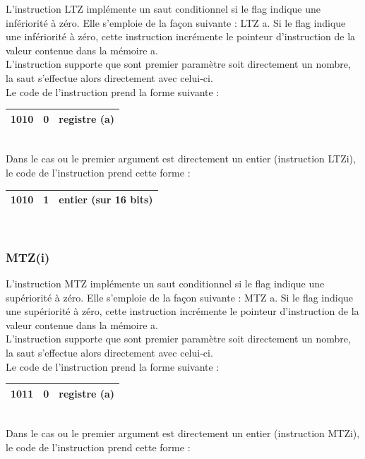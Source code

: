\documentclass[a4paper, 12pt, twoside]{report}
\begin{document}
L'instruction LTZ implémente un saut conditionnel si le flag indique une infériorité à zéro. 
Elle s'emploie de la façon suivante : LTZ a. Si le flag indique une infériorité à zéro, 
cette instruction incrémente le pointeur d'instruction de la valeur contenue dans 
la mémoire a.\\
L'instruction supporte que sont premier paramètre soit directement un nombre, la saut
s'effectue alors directement avec celui-ci.\\

Le code de l'instruction prend la forme suivante :

\begin{tabular}{|c|c|c|}
  \hline
  1010 & 0 & registre (a) \\
  \hline
\end{tabular}\\

Dans le cas ou le premier argument est directement un entier (instruction LTZi),
le code de l'instruction prend cette forme :

\begin{tabular}{|c|c|c|}
  \hline
  1010 & 1 & entier (sur 16 bits)\\
  \hline
\end{tabular}\\

\subsubsection{MTZ(i)}

L'instruction MTZ implémente un saut conditionnel si le flag indique une supériorité à zéro. 
Elle s'emploie de la façon suivante : MTZ a. Si le flag indique une supériorité à zéro, 
cette instruction incrémente le pointeur d'instruction de la valeur contenue dans 
la mémoire a.\\
L'instruction supporte que sont premier paramètre soit directement un nombre, la saut
s'effectue alors directement avec celui-ci.\\

Le code de l'instruction prend la forme suivante :

\begin{tabular}{|c|c|c|}
  \hline
  1011 & 0 & registre (a) \\
  \hline
\end{tabular}\\

Dans le cas ou le premier argument est directement un entier (instruction MTZi),
le code de l'instruction prend cette forme :
\end{document}
